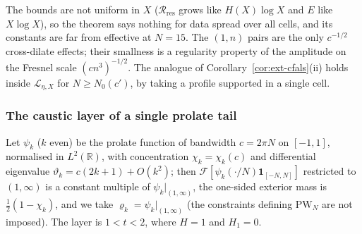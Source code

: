 \documentclass[11pt]{amsart}
\theoremstyle{definition}
\theoremstyle{remark}
\newcommand{\R}{\mathbb R}
\begin{document}
The bounds are not uniform in $X$ ($\mathcal R_{\mathrm{res}}$ grows like $H(X)\log X$ and $E$ like $X\log X$), so the theorem
says nothing for data spread over all cells, and its constants are far from effective at $N=15$. The $(1,n)$ pairs are the only
$c^{-1/2}$ cross-dilate effects; their smallness is a regularity property of the amplitude on the Fresnel scale $(cn^3)^{-1/2}$.
The analogue of Corollary~\ref{cor:ext-cfals}(ii) holds inside $\mathcal L_{\eta,X}$ for $N\ge N_0(c')$, by taking a profile supported
in a single cell.

\subsubsection*{The caustic layer of a single prolate tail}

Let $\psi_k$ ($k$ even) be the prolate function of bandwidth $c=2\pi N$ on $[-1,1]$, normalised in $L^2(\R)$, with concentration
$\chi_k=\chi_k(c)$ and differential eigenvalue $\vartheta_k=c(2k+1)+O(k^2)$; then $\mathcal F[\psi_k(\cdot/N)\mathbf 1_{[-N,N]}]$ restricted to
$(1,\infty)$ is a constant multiple of $\psi_k|_{(1,\infty)}$, the one-sided exterior mass is $\frac12(1-\chi_k)$, and we take $\varrho_k=\psi_k|_{(1,\infty)}$ (the constraints defining $\mathrm{PW}_N$ are not imposed). The layer is $1<t<2$, where $H=1$ and $H_1=0$.
\end{document}
